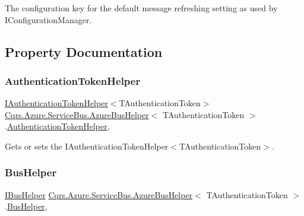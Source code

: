 The configuration key for the default message refreshing setting as used by I\+Configuration\+Manager. 



\subsection{Property Documentation}
\mbox{\label{classCqrs_1_1Azure_1_1ServiceBus_1_1AzureBusHelper_abe32e0fe4ef131a0ae209b75eadcbbcd_abe32e0fe4ef131a0ae209b75eadcbbcd}} 
\subsubsection{\texorpdfstring{Authentication\+Token\+Helper}{AuthenticationTokenHelper}}
{\footnotesize\ttfamily \hyperlink{interfaceCqrs_1_1Authentication_1_1IAuthenticationTokenHelper}{I\+Authentication\+Token\+Helper}$<$T\+Authentication\+Token$>$ \hyperlink{classCqrs_1_1Azure_1_1ServiceBus_1_1AzureBusHelper}{Cqrs.\+Azure.\+Service\+Bus.\+Azure\+Bus\+Helper}$<$ T\+Authentication\+Token $>$.\hyperlink{classCqrs_1_1Authentication_1_1AuthenticationTokenHelper}{Authentication\+Token\+Helper}\hspace{0.3cm}{\ttfamily [get]}, {\ttfamily [protected]}}



Gets or sets the I\+Authentication\+Token\+Helper$<$\+T\+Authentication\+Token$>$. 

\mbox{\label{classCqrs_1_1Azure_1_1ServiceBus_1_1AzureBusHelper_a1a827b64ae73d8c368852e77dc94a2b1_a1a827b64ae73d8c368852e77dc94a2b1}} 
\subsubsection{\texorpdfstring{Bus\+Helper}{BusHelper}}
{\footnotesize\ttfamily \hyperlink{interfaceCqrs_1_1Bus_1_1IBusHelper}{I\+Bus\+Helper} \hyperlink{classCqrs_1_1Azure_1_1ServiceBus_1_1AzureBusHelper}{Cqrs.\+Azure.\+Service\+Bus.\+Azure\+Bus\+Helper}$<$ T\+Authentication\+Token $>$.\hyperlink{classCqrs_1_1Bus_1_1BusHelper}{Bus\+Helper}\hspace{0.3cm}{\ttfamily [get]}, {\ttfamily [protected]}}



